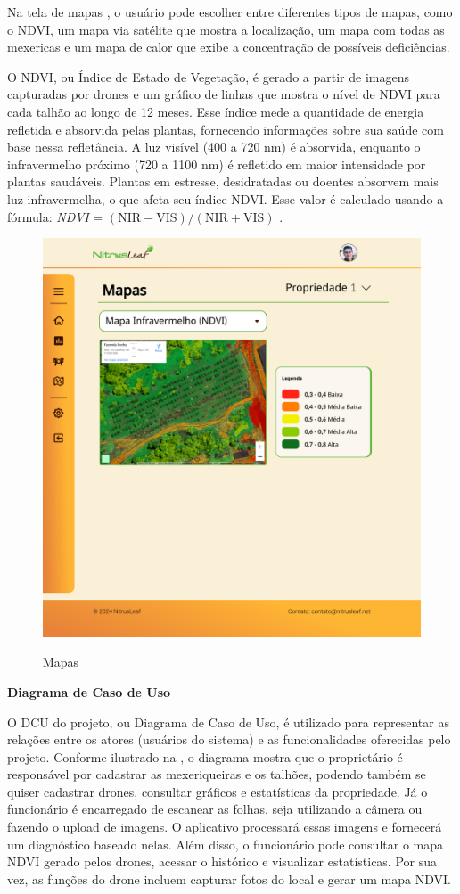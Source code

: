 Na tela de mapas , o usuário pode escolher entre diferentes tipos de mapas, como o NDVI, um mapa via satélite que mostra a localização, um mapa com todas as mexericas e um mapa de calor que exibe a concentração de possíveis deficiências.

O NDVI, ou Índice de Estado de Vegetação, é gerado a partir de imagens capturadas por drones e um gráfico de linhas que mostra o nível de NDVI para cada talhão ao longo de 12 meses. Esse índice mede a quantidade de energia refletida e absorvida pelas plantas, fornecendo informações sobre sua saúde com base nessa refletância. A luz visível (400 a 720 nm) é absorvida, enquanto o infravermelho próximo (720 a 1100 nm) é refletido em maior intensidade por plantas saudáveis. Plantas em estresse, desidratadas ou doentes absorvem mais luz infravermelha, o que afeta seu índice NDVI. Esse valor é calculado usando a fórmula: \textit{NDVI} = \((\text{NIR} - \text{VIS}) / (\text{NIR} + \text{VIS})\) \cite{ResultadoNDVIArtigo, ResultadoNDVISite}.

\begin{figure}[H]
\centering
\caption{Mapas}
\includegraphics[width=0.7\linewidth]{Illustrations/tela-mapas.png}
\label{fig:tela-mapas}
\end{figure}

\textbf{Diagrama de Caso de Uso}

O DCU do projeto, ou Diagrama de Caso de Uso, é utilizado para representar as relações entre os atores (usuários do sistema) e as funcionalidades oferecidas pelo projeto. Conforme ilustrado na , o diagrama mostra que o proprietário é responsável por cadastrar as mexeriqueiras e os talhões, podendo também se quiser cadastrar drones, consultar gráficos e estatísticas da propriedade. Já o funcionário é encarregado de escanear as folhas, seja utilizando a câmera ou fazendo o upload de imagens. O aplicativo processará essas imagens e fornecerá um diagnóstico baseado nelas. Além disso, o funcionário pode consultar o mapa NDVI gerado pelos drones, acessar o histórico e visualizar estatísticas. Por sua vez, as funções do drone incluem capturar fotos do local e gerar um mapa NDVI.



